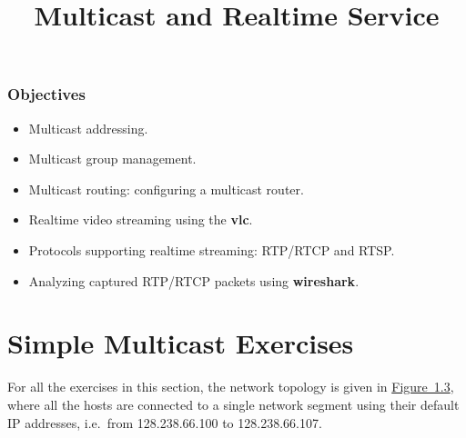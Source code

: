 \documentclass{UTNetLab}
\title{Multicast and Realtime Service}
\begin{document}
	\section*{Objectives}
	\begin{itemize}
		\item Multicast addressing.
		\item Multicast group management.
		\item Multicast routing: configuring a multicast router.
		\item [-] Realtime video streaming using the \textbf{vlc}.
		\item [-] Protocols supporting realtime streaming: RTP/RTCP and RTSP.
		\item [-] Analyzing captured RTP/RTCP packets using \textbf{wireshark}.
	\end{itemize}
\part{Simple Multicast Exercises\label{sec:simple-multicast}}
    For all the exercises in this section, the network topology is given in \hyperref[fig:1.3]{Figure~1.3}, where all the hosts are connected to a single network segment using their default IP addresses, i.e.\ from 128.238.66.100 to 128.238.66.107.
    
\end{document}
